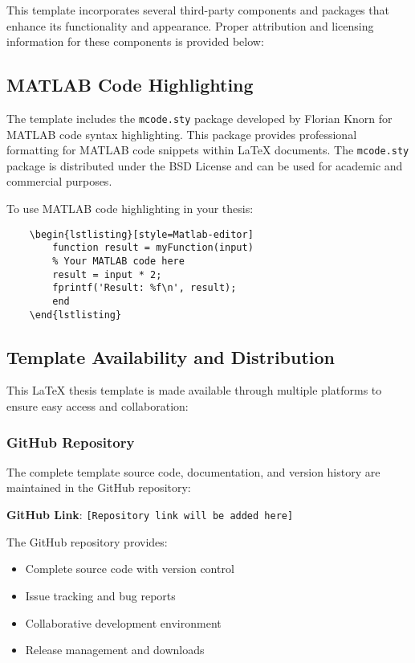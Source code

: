 This template incorporates several third-party components and packages that enhance its functionality and appearance. Proper attribution and licensing information for these components is provided below:

\subsection{MATLAB Code Highlighting}
\label{subsec:mcode}

The template includes the \texttt{mcode.sty} package developed by Florian Knorn for MATLAB code syntax highlighting. This package provides professional formatting for MATLAB code snippets within LaTeX documents. The \texttt{mcode.sty} package is distributed under the BSD License and can be used for academic and commercial purposes.

To use MATLAB code highlighting in your thesis:

\begin{verbatim}
	\begin{lstlisting}[style=Matlab-editor]
		function result = myFunction(input)
		% Your MATLAB code here
		result = input * 2;
		fprintf('Result: %f\n', result);
		end
	\end{lstlisting}
\end{verbatim}

\subsection{Template Availability and Distribution}
\label{subsec:template_availability}

This LaTeX thesis template is made available through multiple platforms to ensure easy access and collaboration:

\subsubsection{GitHub Repository}
The complete template source code, documentation, and version history are maintained in the GitHub repository:

\textbf{GitHub Link}: \texttt{[Repository link will be added here]}

The GitHub repository provides:
\begin{itemize}
	\item Complete source code with version control
	\item Issue tracking and bug reports
	\item Collaborative development environment
	\item Release management and downloads
\end{itemize}

